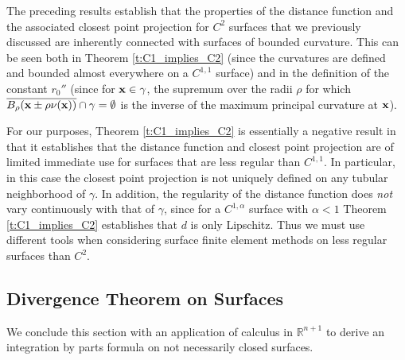 The preceding results establish that the properties of the distance function and the associated closest point projection for $C^2$ surfaces that we previously discussed are inherently connected with surfaces of bounded curvature.  This can be seen both in Theorem \ref{t:C1_implies_C2} (since the curvatures are defined and bounded almost everywhere on a $C^{1,1}$ surface) and in the definition of the constant $r_0{''}$ (since for ${\bf x} \in \gamma$, the supremum over the radii $\rho$ for which $\overline{B_\rho ({\bf x} \pm \rho \nu({\bf x}))} \cap \gamma = \emptyset$ is the inverse of the maximum principal curvature at ${\bf x}$).  

For our purposes, Theorem \ref{t:C1_implies_C2} is essentially a negative result in that it establishes that the distance function and closest point projection are of limited immediate use for surfaces that are less regular than $C^{1,1}$.  In particular, in this case the closest point projection is not uniquely defined on any tubular neighborhood of $\gamma$.  In addition, the regularity of the distance function does {\it not} vary continuously with that of $\gamma$, since for a $C^{1,\alpha}$ surface with $\alpha<1$ Theorem \ref{t:C1_implies_C2}  establishes that $d$ is only Lipschitz.  Thus we must use different tools when considering surface finite element methods on less regular surfaces than $C^2$.  

\subsection{Divergence Theorem on Surfaces}\label{S:diver-thm}
%
We conclude this section with an application of calculus in $\mathbb{R}^{n+1}$
to derive an integration by parts formula on not necessarily closed surfaces.

